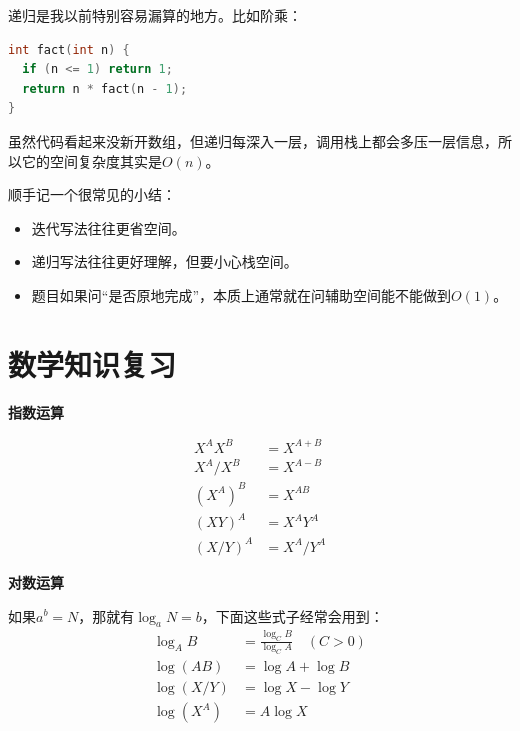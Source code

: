 \documentclass[b5paper,11pt]{article}
\begin{document}
递归是我以前特别容易漏算的地方。比如阶乘：
\begin{lstlisting}[language=C]
int fact(int n) {
  if (n <= 1) return 1;
  return n * fact(n - 1);
}
\end{lstlisting}
虽然代码看起来没新开数组，但递归每深入一层，调用栈上都会多压一层信息，所以它的空间复杂度其实是$O(n)$。

顺手记一个很常见的小结：
\begin{itemize}
  \item 迭代写法往往更省空间。
  \item 递归写法往往更好理解，但要小心栈空间。
  \item 题目如果问“是否原地完成”，本质上通常就在问辅助空间能不能做到$O(1)$。
\end{itemize}

\section{数学知识复习}

\begingroup
\small
{}
\noindent
\begin{minipage}[t]{0.485\textwidth}
  \vspace{0pt}
  {\bfseries\color{ctp-blue}指数运算}\par
  \vspace{0.15em}
  \[
    \begin{aligned}
      X^A X^B &= X^{A+B} \\
      X^A / X^B &= X^{A-B} \\
      (X^A)^B &= X^{AB} \\
      (XY)^A &= X^A Y^A \\
      (X/Y)^A &= X^A / Y^A
    \end{aligned}
  \]
\end{minipage}
\hfill
\begin{minipage}[t]{0.485\textwidth}
  \vspace{0pt}
  {\bfseries\color{ctp-blue}对数运算}\par
  如果$a^b = N$，那就有$\log_a N = b$，下面这些式子经常会用到：
  \[
    \begin{aligned}
      \log_{A}{B} &= \frac{\log_{C}{B}}{\log_{C}{A}} \quad (C > 0) \\
      \log(AB) &= \log A + \log B \\
      \log(X/Y) &= \log X - \log Y \\
      \log(X^A) &= A \log X
    \end{aligned}
  \]
\end{minipage}
\end{document}
